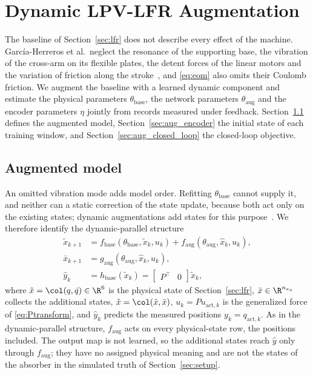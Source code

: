 \section{Dynamic LPV-LFR Augmentation}\label{sec:augmentation}

The baseline of Section~\ref{sec:lfr} does not describe every effect of the
machine.
Garc\'ia-Herreros et al.\ neglect the resonance of the supporting base, the
vibration of the cross-arm on its flexible plates, the detent forces of the
linear motors and the variation of friction along the
stroke~\cite[Sec.~2.4]{garcia2013model}, and \eqref{eq:eom} also omits
their Coulomb friction.
We augment the baseline with a learned dynamic component and estimate the
physical parameters $\theta_{\mathrm{base}}$, the network parameters
$\theta_{\mathrm{aug}}$ and the encoder parameters $\eta$ jointly from
records measured under feedback.
Section~\ref{sec:aug_structure} defines the augmented model,
Section~\ref{sec:aug_encoder} the initial state of each training window, and
Section~\ref{sec:aug_closed_loop} the closed-loop objective.

\subsection{Augmented model}\label{sec:aug_structure}
An omitted vibration mode adds model order.
Refitting $\theta_{\mathrm{base}}$ cannot supply it, and neither can a
static correction of the state update, because both act only on the
existing states; dynamic augmentations add states for this
purpose~\cite[Sec.~2]{hoekstra2025lfr}.
We therefore identify the dynamic-parallel
structure~\cite[Table~1]{hoekstra2026lfr}
\begin{equation}
\begin{aligned}
 \tilde x_{k+1}
 &=f_{\mathrm{base}}(\theta_{\mathrm{base}},\tilde x_k,u_k)
   +f_{\mathrm{aug}}(\theta_{\mathrm{aug}},\hat x_k,u_k),\\
 \bar x_{k+1}
 &=g_{\mathrm{aug}}(\theta_{\mathrm{aug}},\hat x_k,u_k),\\
 \hat y_k&=h_{\mathrm{base}}(\tilde x_k)
   =\begin{bmatrix}P^\top & 0\end{bmatrix}\tilde x_k ,
\end{aligned}
\label{eq:aug_transition}
\end{equation}
where $\tilde x=\col(q,\dot q)\in\R^6$ is the physical state of
Section~\ref{sec:lfr}, $\bar x\in\R^{n_{x_a}}$ collects the additional
states, $\hat x=\col(\tilde x,\bar x)$, $u_k=Pu_{\mathrm{act},k}$ is the
generalized force of \eqref{eq:Ptransform}, and $\hat y_k$ predicts the
measured positions $y_k=q_{\mathrm{act},k}$.
As in the dynamic-parallel structure, $f_{\mathrm{aug}}$ acts on every
physical-state row, the positions included.
The output map is not learned, so the additional states reach $\hat y$
only through $f_{\mathrm{aug}}$; they have no assigned physical meaning and
are not the states of the absorber in the simulated truth of
Section~\ref{sec:setup}.

